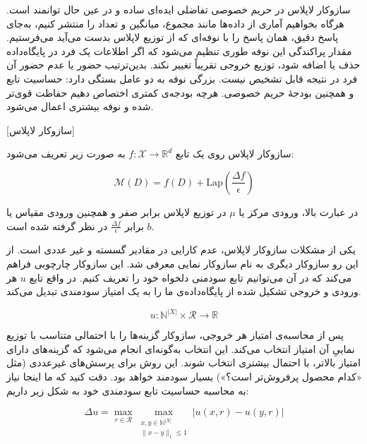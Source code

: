 
سازوکار لاپلاس در حریم خصوصی تفاضلی ایده‌ای ساده و در عین حال توانمند است. هرگاه بخواهیم آماری از داده‌ها مانند مجموع، میانگین و تعداد را منتشر کنیم، به‌جای پاسخ دقیق، همان پاسخ را با نوفه‌ای که از توزیع لاپلاس بدست می‌آید می‌فرستیم. مقدار پراکندگی این نوفه طوری تنظیم می‌شود که اگر اطلاعات یک فرد در پایگاه‌داده حذف یا اضافه شود، توزیع خروجی تقریباً تغییر نکند.  بدین‌ترتیب حضور یا عدم حضور آن فرد در نتیجه قابل تشخیص نیست. بزرگی نوفه به دو عامل بستگی دارد: حساسیت تابع و همچنین بودجهٔ حریم خصوصی. هرچه بودجه‌ی کمتری اختصاص دهیم حفاظت قوی‌تر شده و نوفه بیشتری اعمال می‌شود.

[سازوکار لاپلاس]

سازوکار لاپلاس روی یک تابع $ f : \mathcal{X} \to \mathbb{R}^d$ به صورت زیر تعریف می‌شود:

\begin{equation}
\mathcal{M}(D) = f(D) + \text{Lap}\left(\frac{\Delta f}{\epsilon}\right)
\end{equation}


در عبارت بالا، ورودی مرکز یا $\mu$ در توزیع لاپلاس برابر صفر و همچنین ورودی مقیاس یا $b$ برابر $\frac{\Delta f}{\epsilon}$ در نظر گرفته شده است.



یکی از مشکلات سازوکار لاپلاس، عدم کارایی در مقادیر گسسته و غیر عددی است. از این رو سازوکار دیگری به نام سازوکار نمایی معرفی شد. این سازوکار چارچوبی فراهم می‌کند که در آن می‌توانیم تابع سودمنی دلخواه خود را تعریف کنیم. در واقع تابع $u$ هر ورودی و خروجی‌ تشکیل شده از پایگاه‌داده‌ی ما را به یک امتیاز سودمندی تبدیل می‌کند.

\begin{equation}
u : \mathbb{N}^{|X|} \times \mathcal{R} \rightarrow \mathbb{R}
\end{equation}

پس از محاسبه‌ی امتیاز هر خروجی، سازوکار گزینه‌ها را با احتمالی متناسب با توزیع نماییِ آن امتیاز انتخاب می‌کند. این انتخاب به‌گونه‌ای انجام می‌شود که گزینه‌های دارای امتیاز بالاتر، با احتمال بیشتری انتخاب شوند. این روش برای پرسش‌های غیرعددی (مثل «کدام محصول پرفروش‌تر است؟») بسیار سودمند خواهد بود. دقت کنید که ما اینجا نیاز به محاسبه حساسیت تابع سودمندی خود به شکل زیر داریم:

\begin{equation}
\Delta u = \max_{r \in \mathcal{R}} \max_{\substack{x,y \in \mathbb{N}^{|X|} \\ \|x - y\|_1 \leq 1}} |u(x,r) - u(y,r)|
\end{equation}

